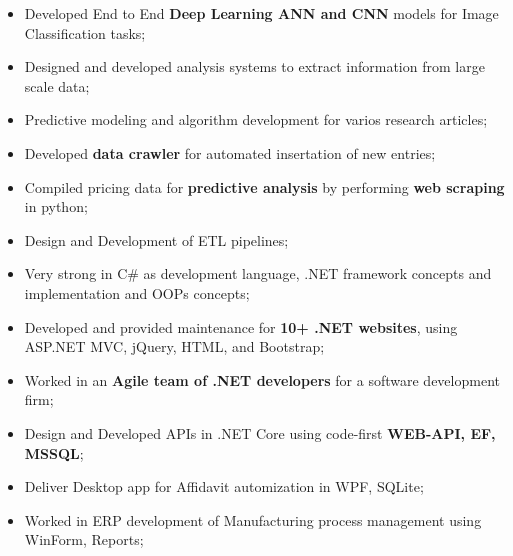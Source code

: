 \documentclass[10pt,a4paper]{altacv}
\begin{document}


%

\begin{fullwidth}
\makecvheader
\end{fullwidth}

%





\begin{itemize}
	\item Developed End to End \textbf{Deep Learning ANN and CNN} models for Image Classification tasks;
	\item Designed and developed analysis systems to extract information from large scale data;
	\item Predictive modeling and algorithm development for varios research articles;
  \item Developed \textbf{data crawler} for automated insertation of new entries;
	\item Compiled pricing data for \textbf{predictive analysis} by performing \textbf{web scraping} in python;
	\item Design and Development of ETL pipelines;
\end{itemize}

\divider
%


\begin{itemize}
	\item Very strong in C\# as development language, .NET framework concepts and implementation and OOPs concepts;
	\item Developed and provided maintenance for \textbf{10+ .NET websites}, using ASP.NET MVC, jQuery, HTML, and Bootstrap;
	\item Worked in an \textbf{Agile team of .NET developers} for a software development firm;
	\item Design and Developed APIs in .NET Core using code-first \textbf{WEB-API, EF, MSSQL};
	\item Deliver Desktop app for Affidavit automization in WPF, SQLite;
	\item Worked in ERP development of Manufacturing process management using WinForm, Reports;
\end{itemize}
\end{document}
